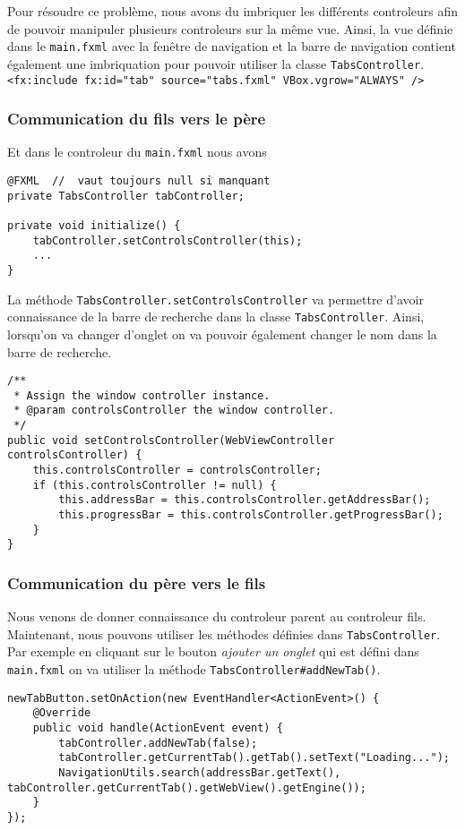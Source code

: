 \documentclass[10pt,a4paper]{article}
\begin{document}
Pour résoudre ce problème, nous avons du imbriquer les différents controleurs afin de pouvoir manipuler plusieurs controleurs sur la même vue. Ainsi, la vue définie dans le \verb|main.fxml| avec la fenêtre de navigation et la barre de navigation contient également une imbriquation pour pouvoir utiliser la classe \verb|TabsController|. \\
\verb|<fx:include fx:id="tab" source="tabs.fxml" VBox.vgrow="ALWAYS" />|

\subsubsection{Communication du fils vers le père}
Et dans le controleur du \verb|main.fxml| nous avons
\begin{lstlisting}
@FXML  //  vaut toujours null si manquant
private TabsController tabController;

private void initialize() {
	tabController.setControlsController(this);
	...
}
\end{lstlisting}

La méthode \verb|TabsController.setControlsController| va permettre d'avoir connaissance de la barre de recherche dans la classe \verb|TabsController|. Ainsi, lorsqu'on va changer d'onglet on va pouvoir également changer le nom dans la barre de recherche.
\begin{lstlisting}
/**
 * Assign the window controller instance.
 * @param controlsController the window controller.
 */
public void setControlsController(WebViewController controlsController) {
	this.controlsController = controlsController;
	if (this.controlsController != null) {
		this.addressBar = this.controlsController.getAddressBar();
		this.progressBar = this.controlsController.getProgressBar();
	}
}
\end{lstlisting}

\subsubsection{Communication du père vers le fils}

Nous venons de donner connaissance du controleur parent au controleur fils. Maintenant, nous pouvons utiliser les méthodes définies dans \verb|TabsController|. Par exemple en cliquant sur le bouton \textit{ajouter un onglet} qui est défini dans \verb|main.fxml| on va utiliser la méthode \verb|TabsController#addNewTab()|. 
\begin{lstlisting}
newTabButton.setOnAction(new EventHandler<ActionEvent>() {
	@Override
	public void handle(ActionEvent event) {
		tabController.addNewTab(false);
    	tabController.getCurrentTab().getTab().setText("Loading...");
		NavigationUtils.search(addressBar.getText(), tabController.getCurrentTab().getWebView().getEngine());
	}
});
\end{lstlisting}
\end{document}
